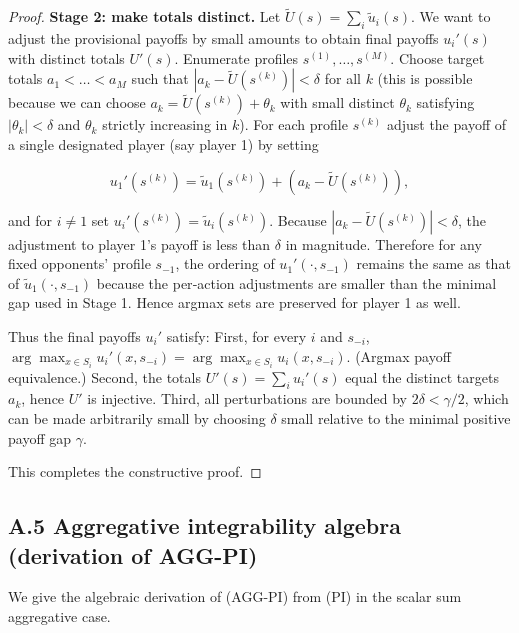 \documentclass[11pt]{article}
\begin{document}
\begin{proof}
\textbf{Stage 2: make totals distinct.} Let \(\tilde U(s)=\sum_i \tilde u_i(s)\).
We want to adjust the provisional payoffs by small amounts to obtain final
payoffs \(u_i'(s)\) with distinct totals \(U'(s)\). Enumerate profiles
\(s^{(1)},\dots,s^{(M)}\). Choose target totals \(a_1<\dots<a_M\) such that
\(|a_k-\tilde U(s^{(k)})|<\delta\) for all \(k\) (this is possible because
we can choose \(a_k=\tilde U(s^{(k)})+\theta_k\) with small distinct
\(\theta_k\) satisfying \(|\theta_k|<\delta\) and \(\theta_k\) strictly
increasing in \(k\)). For each profile \(s^{(k)}\) adjust the payoff of a
single designated player (say player 1) by setting


\[
u_1'(s^{(k)}) = \tilde u_1(s^{(k)}) + (a_k-\tilde U(s^{(k)})),
\]


and for \(i\ne 1\) set \(u_i'(s^{(k)})=\tilde u_i(s^{(k)})\). Because
\(|a_k-\tilde U(s^{(k)})|<\delta\), the adjustment to player 1's payoff is
less than \(\delta\) in magnitude. Therefore for any fixed opponents'
profile \(s_{-1}\), the ordering of \(u_1'(\cdot,s_{-1})\) remains the same
as that of \(\tilde u_1(\cdot,s_{-1})\) because the per‑action adjustments
are smaller than the minimal gap used in Stage 1. Hence argmax sets are
preserved for player 1 as well.

Thus the final payoffs \(u_i'\) satisfy:
First, for every \(i\) and \(s_{-i}\), \(\arg\max_{x\in S_i} u_i'(x,s_{-i})
    = \arg\max_{x\in S_i} u_i(x,s_{-i})\). (Argmax payoff equivalence.) Second, the totals \(U'(s)=\sum_i u_i'(s)\) equal the distinct targets \(a_k\),
    hence \(U'\) is injective. Third, all perturbations are bounded by \(2\delta<\gamma/2\), which can be
    made arbitrarily small by choosing \(\delta\) small relative to the
    minimal positive payoff gap \(\gamma\).

This completes the constructive proof.
\end{proof}


\subsection{A.5 Aggregative integrability algebra (derivation of AGG-PI)}

We give the algebraic derivation of (AGG-PI) from (PI) in the scalar sum
aggregative case.
\end{document}
